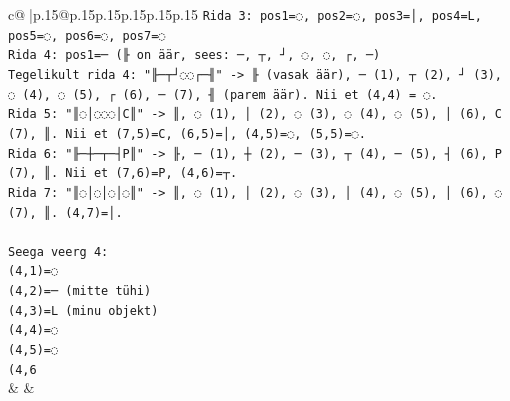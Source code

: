 \documentclass{article}
\begin{document}
{\begin{supertabular}{c@{$\;$}|p{.15\linewidth}@{}p{.15\linewidth}p{.15\linewidth}p{.15\linewidth}p{.15\linewidth}p{.15\linewidth}}
{{{\texttt{Rida 3: pos1=◌, pos2=◌, pos3=│, pos4=L, pos5=◌, pos6=◌, pos7=◌} \\
\texttt{Rida 4: pos1=─ (╟ on äär, sees: ─, ┬, ┘, ◌, ◌, ┌, ─)} \\
\texttt{Tegelikult rida 4: "╟─┬┘◌◌┌─╢" {-}> ╟ (vasak äär), ─ (1), ┬ (2), ┘ (3), ◌ (4), ◌ (5), ┌ (6), ─ (7), ╢ (parem äär). Nii et (4,4) = ◌.} \\
\texttt{Rida 5: "║◌│◌◌◌│C║" {-}> ║, ◌ (1), │ (2), ◌ (3), ◌ (4), ◌ (5), │ (6), C (7), ║. Nii et (7,5)=C, (6,5)=│, (4,5)=◌, (5,5)=◌.} \\
\texttt{Rida 6: "╟─┼─┬─┤P║" {-}> ╟, ─ (1), ┼ (2), ─ (3), ┬ (4), ─ (5), ┤ (6), P (7), ║. Nii et (7,6)=P, (4,6)=┬.} \\
\texttt{Rida 7: "║◌│◌│◌│◌║" {-}> ║, ◌ (1), │ (2), ◌ (3), │ (4), ◌ (5), │ (6), ◌ (7), ║. (4,7)=│.} \\
\\ 
\texttt{Seega veerg 4:} \\
\texttt{(4,1)=◌} \\
\texttt{(4,2)=─ (mitte tühi)} \\
\texttt{(4,3)=L (minu objekt)} \\
\texttt{(4,4)=◌} \\
\texttt{(4,5)=◌} \\
\texttt{(4,6} \\
            }
        }
    }
    & & \\ \\


\end{supertabular}}
\end{document}
